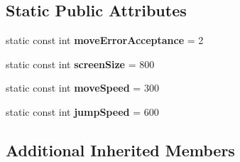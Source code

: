 \subsection*{Static Public Attributes}
\begin{DoxyCompactItemize}
\item 
\hypertarget{classSlime_a33c70f396f273db5c1bd716a7f520bb2}{static const int {\bfseries move\-Error\-Acceptance} = 2}\label{classSlime_a33c70f396f273db5c1bd716a7f520bb2}

\item 
\hypertarget{classSlime_a5b95a92ca5e1c3f3b93522f66fbc2668}{static const int {\bfseries screen\-Size} = 800}\label{classSlime_a5b95a92ca5e1c3f3b93522f66fbc2668}

\item 
\hypertarget{classSlime_a90330dacbc5c177c82a054da6505cd2c}{static const int {\bfseries move\-Speed} = 300}\label{classSlime_a90330dacbc5c177c82a054da6505cd2c}

\item 
\hypertarget{classSlime_a35adc59a855a3e0e5857889a559e7aa9}{static const int {\bfseries jump\-Speed} = 600}\label{classSlime_a35adc59a855a3e0e5857889a559e7aa9}

\end{DoxyCompactItemize}
\subsection*{Additional Inherited Members}



